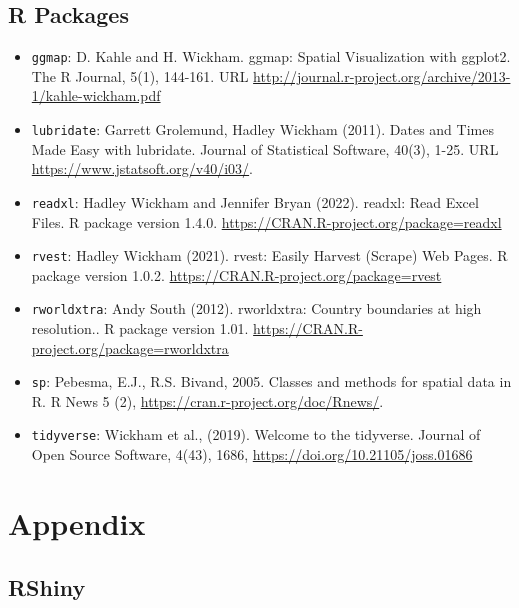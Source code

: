 \documentclass[
]{article}
\providecommand{\tightlist}{%
  \setlength{\itemsep}{0pt}\setlength{\parskip}{0pt}}
\begin{document}
\hypertarget{r-packages}{%
\subsection{R Packages}\label{r-packages}}

\begin{itemize}
\tightlist
\item
  \texttt{ggmap}: D. Kahle and H. Wickham. ggmap: Spatial Visualization
  with ggplot2. The R Journal, 5(1), 144-161. URL
  \url{http://journal.r-project.org/archive/2013-1/kahle-wickham.pdf}
\item
  \texttt{lubridate}: Garrett Grolemund, Hadley Wickham (2011). Dates
  and Times Made Easy with lubridate. Journal of Statistical Software,
  40(3), 1-25. URL \url{https://www.jstatsoft.org/v40/i03/}.
\item
  \texttt{readxl}: Hadley Wickham and Jennifer Bryan (2022). readxl:
  Read Excel Files. R package version 1.4.0.
  \url{https://CRAN.R-project.org/package=readxl}
\item
  \texttt{rvest}: Hadley Wickham (2021). rvest: Easily Harvest (Scrape)
  Web Pages. R package version 1.0.2.
  \url{https://CRAN.R-project.org/package=rvest}
\item
  \texttt{rworldxtra}: Andy South (2012). rworldxtra: Country boundaries
  at high resolution.. R package version 1.01.
  \url{https://CRAN.R-project.org/package=rworldxtra}
\item
  \texttt{sp}: Pebesma, E.J., R.S. Bivand, 2005. Classes and methods for
  spatial data in R. R News 5 (2),
  \url{https://cran.r-project.org/doc/Rnews/}.
\item
  \texttt{tidyverse}: Wickham et al., (2019). Welcome to the tidyverse.
  Journal of Open Source Software, 4(43), 1686,
  \url{https://doi.org/10.21105/joss.01686}
\end{itemize}

\pagebreak

\hypertarget{appendix}{%
\section{Appendix}\label{appendix}}

\hypertarget{rshiny}{%
\subsection{RShiny}\label{rshiny}}
\end{document}
